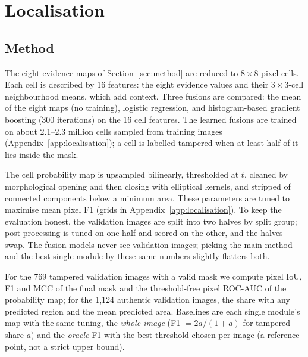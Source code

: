 \section{Localisation}\label{sec:localisation}

\subsection{Method}\label{sec:localisation-method}
The eight evidence maps of Section~\ref{sec:method} are reduced to $8 \times 8$-pixel cells. Each cell is described by 16 features: the eight evidence values and their $3 \times 3$-cell neighbourhood means, which add context. Three fusions are compared: the mean of the eight maps (no training), logistic regression, and histogram-based gradient boosting \cite{friedman2001gbm,pedregosa2011sklearn} (300 iterations) on the 16 cell features. The learned fusions are trained on about 2.1--2.3 million cells sampled from training images (Appendix~\ref{app:localisation}); a cell is labelled tampered when at least half of it lies inside the mask.

The cell probability map is upsampled bilinearly, thresholded at $t$, cleaned by morphological opening and then closing with elliptical kernels, and stripped of connected components below a minimum area. These parameters are tuned to maximise mean pixel F1 (grids in Appendix~\ref{app:localisation}). To keep the evaluation honest, the validation images are split into two halves by split group; post-processing is tuned on one half and scored on the other, and the halves swap. The fusion models never see validation images; picking the main method and the best single module by these same numbers slightly flatters both.

For the 769 tampered validation images with a valid mask we compute pixel IoU, F1 and MCC of the final mask and the threshold-free pixel ROC-AUC of the probability map; for the 1,124 authentic validation images, the share with any predicted region and the mean predicted area. Baselines are each single module's map with the same tuning, the \emph{whole image} (F1 $= 2a/(1+a)$ for tampered share $a$) and the \emph{oracle} F1 with the best threshold chosen per image (a reference point, not a strict upper bound).

